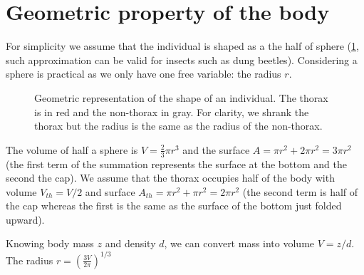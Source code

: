 \documentclass[12pt]{article}
\begin{document}
\section{Geometric property of the body}
For simplicity we assume that the individual is shaped as a the half of sphere (\cref{fig:geo}, such approximation can be valid for insects such as dung beetles).
Considering a sphere is practical as we only have one free variable:  the radius $r$.
\begin{figure}
\begin{center}
	\caption{Geometric representation of the shape of an individual.
	The thorax is in red and the non-thorax in gray.
	For clarity, we shrank the thorax but the radius is the same as the radius of the non-thorax.
	}
	\label{fig:geo}
\end{center}
\end{figure}
The volume of half a sphere is $V = \frac{2}{3} \pi r^3$ and the surface $A = \pi r^2 + 2 \pi r^ 2 = 3 \pi r^2$ (the first term of the summation represents the surface at the bottom and the second the cap).
We assume that the thorax occupies half of the body with volume $V_{th} = V/2$ and surface $A_{th} = \pi r^2 + \pi r^2 = 2 \pi r^2$ (the second term is half of the cap whereas the first is the same as the surface of the bottom just folded upward).

Knowing body mass $z$ and density $d$, we can convert mass into volume $ V = z/d$.
The radius $r = \left( \frac{3V}{2 \pi} \right)^{1/3}$
\end{document}

